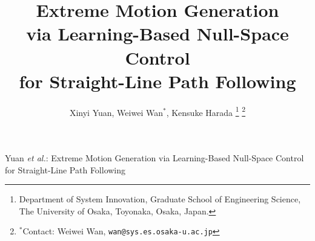 \documentclass[journal, twoside]{IEEEtran}
\begin{document}
\title{Extreme Motion Generation \\via Learning-Based Null-Space Control\\ for Straight-Line Path Following}
\author{Xinyi Yuan, Weiwei Wan$^{*}$, Kensuke Harada
\thanks{Department of System Innovation, Graduate School of Engineering Science, The University of Osaka, Toyonaka, Osaka, Japan.}
\thanks{$^{*}$Contact: Weiwei Wan, {\tt\small wan@sys.es.osaka-u.ac.jp}}}
{Yuan \MakeLowercase{\textit{et al.}}: Extreme Motion Generation via Learning-Based Null-Space Control for Straight-Line Path Following}
\maketitle
\end{document}
